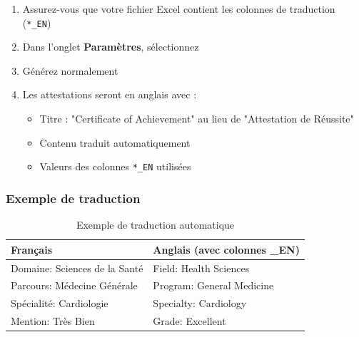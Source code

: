 \begin{enumerate}[leftmargin=*]
    \item Assurez-vous que votre fichier Excel contient les colonnes de traduction (\texttt{*\_EN})
    \item Dans l'onglet \textbf{Paramètres}, sélectionnez 
    \item Générez normalement
    \item Les attestations seront en anglais avec :
    \begin{itemize}
        \item Titre : "Certificate of Achievement" au lieu de "Attestation de Réussite"
        \item Contenu traduit automatiquement
        \item Valeurs des colonnes \texttt{*\_EN} utilisées
    \end{itemize}
\end{enumerate}

\subsubsection{Exemple de traduction}

\begin{table}[h]
\centering
\begin{tabular}{|l|l|}
\hline
\textbf{Français} & \textbf{Anglais (avec colonnes \_EN)} \\
\hline
Domaine: Sciences de la Santé & Field: Health Sciences \\
\hline
Parcours: Médecine Générale & Program: General Medicine \\
\hline
Spécialité: Cardiologie & Specialty: Cardiology \\
\hline
Mention: Très Bien & Grade: Excellent \\
\hline
\end{tabular}
\caption{Exemple de traduction automatique}
\end{table}

\newpage
